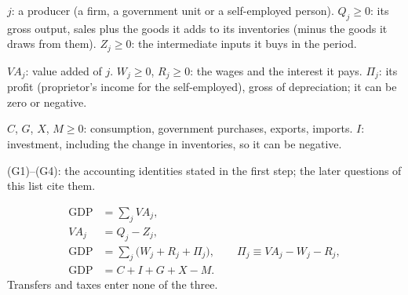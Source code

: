 \begin{sol}
\begin{notacao}
\item $j$: a producer (a firm, a government unit or a self-employed person). $Q_j\ge0$: its gross output, sales plus the goods it
adds to its inventories (minus the goods it draws from them). $Z_j\ge0$: the intermediate inputs it buys in the period.
\item $VA_j$: value added of $j$. $W_j\ge0$, $R_j\ge0$: the wages and the interest it pays. $\Pi_j$: its profit (proprietor's
income for the self-employed), gross of depreciation; it can be zero or negative.
\item $C$, $G$, $X$, $M\ge0$: consumption, government purchases, exports, imports. $I$: investment, including the change in
inventories, so it can be negative.
\item (G1)--(G4): the accounting identities stated in the first step; the later questions of this list cite them.
\end{notacao}

\begin{align}
\text{GDP} &= \textstyle\sum_j VA_j, \tag{G1}\label{q1:G1}\\
VA_j &= Q_j-Z_j, \tag{G2}\label{q1:G2}\\
\text{GDP} &= \textstyle\sum_j\big(W_j+R_j+\Pi_j\big),\qquad \Pi_j\equiv VA_j-W_j-R_j, \tag{G3}\label{q1:G3}\\
\text{GDP} &= C+I+G+X-M. \tag{G4}\label{q1:G4}
\end{align}
Transfers and taxes enter none of the three.


\end{sol}
